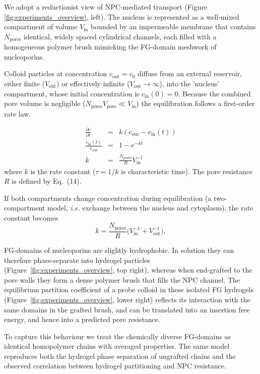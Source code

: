 \documentclass[10pt, a4paper, twocolumn]{article}
\begin{document}
We adopt a reductionist view of NPC‐mediated transport (Figure \ref{fig:experiments_overview}, left). 
The nucleus is represented as a well-mixed compartment of volume $V_{\text{in}}$ bounded by an impermeable membrane that contains $N_{\text{pores}}$ identical, widely spaced cylindrical channels, each filled with a homogeneous polymer brush mimicking the FG-domain meshwork of nucleoporins. 

Colloid particles at concentration $c_{\text{out}} = c_{0}$ diffuse from an external reservoir, either finite ($V_{\text{out}}$) or effectively infinite ($V_{\text{out}}\!\to\!\infty$), into the 'nucleus' compartment, whose initial concentration is $c_{\text{in}}(0)=0$.
Because the combined pore volume is negligible ($N_{\text{pores}}V_{\text{pore}}\ll V_{\text{in}}$) the equilibration follows a first-order rate law.

\begin{eqnarray}
    \frac{\partial c}{\partial t} &=& k (c_{\text{out}} - c_{\text{in}}(t)) \\
    \frac{c_{\text{in}}(t)}{c_{\text{out}}} &=& 1 - e^{-kt} \label{eq:kinetics} \\
    k &=& \frac{N_{\text{pores}}}{R} V_{\text{in}}^{-1}
    \label{eq:rate_constant}
\end{eqnarray}
where $k$ is the rate constant ($\tau = 1/k$ is characteristic time).
The pore resistance $R$ is defined by Eq.~(14).

If both compartments change concentration during equilibration
(a two-compartment model, \textit{i.e.} exchange between the nucleus and cytoplasm), the rate constant becomes
\begin{equation}
  k = \frac{N_{\text{pores}}}{R}
      \bigl(V_{\text{in}}^{-1}+V_{\text{out}}^{-1}\bigr),
  \label{eq:rate_constant_2}
\end{equation}

FG-domains of nucleoporins are slightly hydrophobic. 
In solution they can therefore phase-separate into hydrogel particles (Figure~\ref{fig:experiments_overview}, top right), whereas when end-grafted to the pore walls they form a dense polymer brush that fills the NPC channel.
The equilibrium partition coefficient of a probe colloid in these isolated FG hydrogels (Figure~\ref{fig:experiments_overview}, lower right) reflects its interaction with the same domains in the grafted brush, and can be translated into an insertion free energy, and hence into a predicted pore resistance.

To capture this behaviour we treat the chemically diverse FG-domains as identical homopolymer chains with averaged properties.  
The same model reproduces both the hydrogel phase separation of ungrafted chains and the observed correlation between hydrogel
partitioning and NPC resistance.
\end{document}
